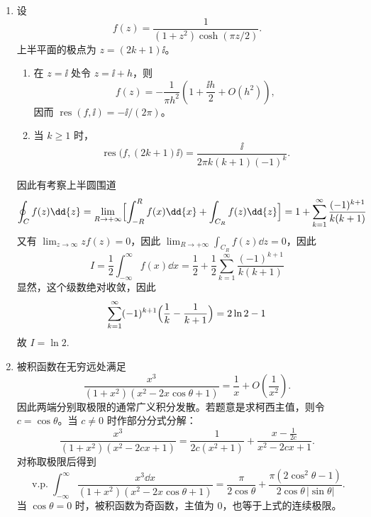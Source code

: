 \begin{question}
\begin{solution}
\begin{enumerate}
由大圆弧引理，\(\displaystyle\lim_{z\to+\infty}z\cdot\frac{z^6}{(z^4+a^4)^2}=0\)，因此有 \(\displaystyle\lim_{R\to+\infty}\int_{C_R}\frac{z^6}{(z^4+a^4)^2}\dd{z}=0\). 故有
\[
\int_0^\infty\frac{x^6}{(x^4+a^4)^2}\dd{x}=\frac1{1+\ii}\cdot\frac{2\pi\ii}{a}\cdot\frac{3(1-\ii)}{16\sqrt2}=\frac{3\pi}{8\sqrt2\,a}
\]

  \item 设
  \[
  f(z)=\frac{1}{(1+z^2)\cosh(\pi z/2)}.
  \]
  上半平面的极点为 \(z=(2k+1)\ii\)。
  \begin{enumerate}
    \item 在 \(z=\ii\) 处令 \(z=\ii+h\)，则
    \[
    f(z)=-\frac1{\pi h^2}\left(1+\frac{\ii h}{2}+O(h^2)\right),
    \]
    因而 \(\operatorname{res}(f,\ii)=-\ii/(2\pi)\)。
    \item 当 \(k\ge1\) 时，
    \[
    \operatorname{res}\bigl(f,(2k+1)\ii\bigr)
    =\frac{\ii}{2\pi k(k+1)(-1)^k}.
    \]
  \end{enumerate}

因此有考察上半圆围道
\[
\oint_C f(z)\dd{z}=\lim_{R\to+\infty}\Bigl[\int_{-R}^{R}f(x)\dd{x}+\int_{C_R}f(z)\dd{z}\Bigr]=1+\sum_{k=1}^{\infty}\frac{(-1)^{k+1}}{k(k+1)}
\]
又有 \(\displaystyle\lim_{z\to\infty}zf(z)=0\)，因此 \(\displaystyle\lim_{R\to+\infty}\int_{C_R}f(z)\dd{z}=0\)，因此
\[
I=\frac12\int_{-\infty}^{\infty}f(x)\dd{x}=\frac12+\frac12\sum_{k=1}^{\infty}\frac{(-1)^{k+1}}{k(k+1)}
\]
显然，这个级数绝对收敛，因此
\[
\sum_{k=1}^{\infty}(-1)^{k+1}\Bigl(\frac1k-\frac1{k+1}\Bigr)=2\ln2-1
\]
故 \(I=\ln2\).

  \item 被积函数在无穷远处满足
  \[
  \frac{x^3}{(1+x^2)(x^2-2x\cos\theta+1)}
  =\frac1x+O\left(\frac1{x^2}\right).
  \]
  因此两端分别取极限的通常广义积分发散。若题意是求柯西主值，则令
  \(c=\cos\theta\)。当 \(c\ne0\) 时作部分分式分解：
  \[
  \frac{x^3}{(1+x^2)(x^2-2cx+1)}
  =\frac{1}{2c(x^2+1)}
  +\frac{x-\frac1{2c}}{x^2-2cx+1}.
  \]
  对称取极限后得到
  \[
  \operatorname{v.p.}\int_{-\infty}^{\infty}
  \frac{x^3\dd{x}}{(1+x^2)(x^2-2x\cos\theta+1)}
  =
  \frac{\pi}{2\cos\theta}
  +\frac{\pi(2\cos^2\theta-1)}
  {2\cos\theta\,|\sin\theta|}.
  \]
  当 \(\cos\theta=0\) 时，被积函数为奇函数，主值为 \(0\)，也等于上式的连续极限。
\end{enumerate}
	\end{solution}
	\end{question}
